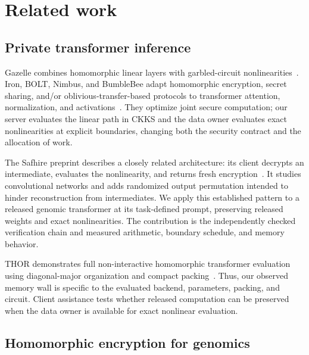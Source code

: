 
\section{Related work}

\subsection{Private transformer inference}

Gazelle combines homomorphic linear layers with garbled-circuit
nonlinearities~\cite{gazelle2018}. Iron, BOLT, Nimbus, and BumbleBee adapt homomorphic encryption,
secret sharing, and/or oblivious-transfer-based protocols to transformer attention,
normalization, and activations~\cite{iron2022,bolt2024,nimbus2024,bumblebee2025}. They optimize
joint secure computation; our server evaluates the linear path in CKKS and the data owner
evaluates exact nonlinearities at explicit boundaries, changing both the security contract and
the allocation of work.

The Safhire preprint describes a closely related architecture: its client decrypts an intermediate,
evaluates the nonlinearity, and returns fresh encryption~\cite{safhire2025}. It studies convolutional
networks and adds randomized output permutation intended to hinder reconstruction from intermediates.
We apply this established pattern to a released genomic transformer at its task-defined prompt,
preserving released weights and exact nonlinearities. The contribution is the independently
checked verification chain and measured arithmetic, boundary schedule, and memory behavior.

THOR demonstrates full non-interactive homomorphic transformer evaluation using diagonal-major
organization and compact packing~\cite{thor}. Thus, our observed memory wall is specific to the
evaluated backend, parameters, packing, and circuit. Client assistance tests whether released
computation can be preserved when the data owner is available for exact nonlinear evaluation.

\subsection{Homomorphic encryption for genomics}

